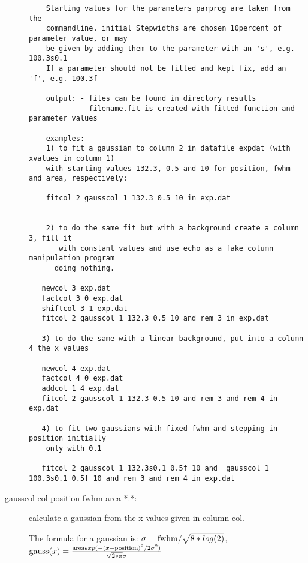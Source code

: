 \begin{description}
\begin{verbatim}
    Starting values for the parameters parprog are taken from the
    commandline. initial Stepwidths are chosen 10percent of parameter value, or may
    be given by adding them to the parameter with an 's', e.g. 100.3s0.1
    If a parameter should not be fitted and kept fix, add an 'f', e.g. 100.3f

    output: - files can be found in directory results
            - filename.fit is created with fitted function and parameter values

    examples:
    1) to fit a gaussian to column 2 in datafile expdat (with xvalues in column 1)
    with starting values 132.3, 0.5 and 10 for position, fwhm and area, respectively:

    fitcol 2 gausscol 1 132.3 0.5 10 in exp.dat


    2) to do the same fit but with a background create a column 3, fill it
       with constant values and use echo as a fake column manipulation program
      doing nothing.

   newcol 3 exp.dat
   factcol 3 0 exp.dat
   shiftcol 3 1 exp.dat
   fitcol 2 gausscol 1 132.3 0.5 10 and rem 3 in exp.dat

   3) to do the same with a linear background, put into a column 4 the x values

   newcol 4 exp.dat
   factcol 4 0 exp.dat
   addcol 1 4 exp.dat
   fitcol 2 gausscol 1 132.3 0.5 10 and rem 3 and rem 4 in exp.dat

   4) to fit two gaussians with fixed fwhm and stepping in position initially
    only with 0.1

   fitcol 2 gausscol 1 132.3s0.1 0.5f 10 and  gausscol 1 100.3s0.1 0.5f 10 and rem 3 and rem 4 in exp.dat
\end{verbatim}

\item[\prg gausscol\index{gausscol} col position fwhm area *.*:] calculate a
gaussian from the x values given in column col.

The formula for a gaussian is:
$\sigma={\rm fwhm}/\sqrt{8*log(2)}$,
${\rm gauss}(x)=\frac{{\rm area} exp(-(x-{\rm position})^2/2 \sigma^2)}{\sqrt{2*\pi}\sigma}$


\end{description}
